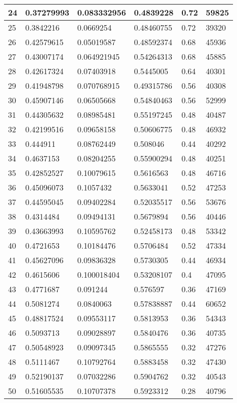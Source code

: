 \begin{longtable}{|l|l|l|l|l|l|}
24 & 0.37279993 & 0.083332956 & 0.4839228 & 0.72 & 59825 \\ \hline 
25 & 0.3842216 & 0.0669254 & 0.48460755 & 0.72 & 39320 \\ \hline 
26 & 0.42579615 & 0.05019587 & 0.48592374 & 0.68 & 45936 \\ \hline 
27 & 0.43007174 & 0.064921945 & 0.54264313 & 0.68 & 45885 \\ \hline 
28 & 0.42617324 & 0.07403918 & 0.5445005 & 0.64 & 40301 \\ \hline 
29 & 0.41948798 & 0.070768915 & 0.49315786 & 0.56 & 40308 \\ \hline 
30 & 0.45907146 & 0.06505668 & 0.54840463 & 0.56 & 52999 \\ \hline 
31 & 0.44305632 & 0.08985481 & 0.55197245 & 0.48 & 40487 \\ \hline 
32 & 0.42199516 & 0.09658158 & 0.50606775 & 0.48 & 46932 \\ \hline 
33 & 0.444911 & 0.08762449 & 0.508046 & 0.44 & 40292 \\ \hline 
34 & 0.4637153 & 0.08204255 & 0.55900294 & 0.48 & 40251 \\ \hline 
35 & 0.42852527 & 0.10079615 & 0.5616563 & 0.48 & 46716 \\ \hline 
36 & 0.45096073 & 0.1057432 & 0.5633041 & 0.52 & 47253 \\ \hline 
37 & 0.44595045 & 0.09402284 & 0.52035517 & 0.56 & 53676 \\ \hline 
38 & 0.4314484 & 0.09494131 & 0.5679894 & 0.56 & 40446 \\ \hline 
39 & 0.43663993 & 0.10595762 & 0.52458173 & 0.48 & 53342 \\ \hline 
40 & 0.4721653 & 0.10184476 & 0.5706484 & 0.52 & 47334 \\ \hline 
41 & 0.45627096 & 0.09836328 & 0.5730305 & 0.44 & 46934 \\ \hline 
42 & 0.4615606 & 0.100018404 & 0.53208107 & 0.4 & 47095 \\ \hline 
43 & 0.4771687 & 0.091244 & 0.576597 & 0.36 & 47169 \\ \hline 
44 & 0.5081274 & 0.0840063 & 0.57838887 & 0.44 & 60652 \\ \hline 
45 & 0.48817524 & 0.09553117 & 0.5813953 & 0.36 & 54343 \\ \hline 
46 & 0.5093713 & 0.09028897 & 0.5840476 & 0.36 & 40735 \\ \hline 
47 & 0.50548923 & 0.09097345 & 0.5865555 & 0.32 & 47276 \\ \hline 
48 & 0.5111467 & 0.10792764 & 0.5883458 & 0.32 & 47430 \\ \hline 
49 & 0.52190137 & 0.07032286 & 0.5904762 & 0.32 & 40543 \\ \hline 
50 & 0.51605535 & 0.10707378 & 0.5923312 & 0.28 & 40796 \\ \hline 
\end{longtable}